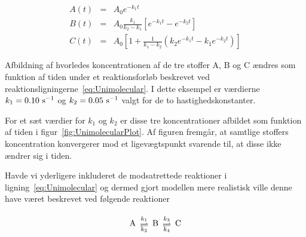 \begin{eqnarray}
  A(t) & = & A_0 e^{-k_1 t}                   \nonumber\\
  B(t) & = & A_0 \frac{k_1}{k_2-k_1} 
  \left[ e^{-k_1 t} - e^{-k_2 t} \right]               \\
  C(t) & = & A_0 \left[ 1 + \frac{1}{k_1-k_2} 
  (k_2 e^{-k_1 t} - k_1 e^{-k_2 t}) \right]   \nonumber
\end{eqnarray}

{
\begin{center}
 \vspace{1cm}
  
 \vspace{1cm}
\end{center}
}
{
\caption{\protect\capsize Afbildning af hvorledes
koncentrationen af de tre stoffer A, B og C {\ae}ndres som
funktion af tiden under et reaktions\-forl{\o}b beskrevet
ved reaktions\-lig\-ningerne~\protect\ref{eq:Unimolecular}.
I dette eksempel er v{\ae}rdierne $k_1 = {\rm 0.10~s}^{-1}$
og $k_2 = {\rm 0.05~s}^{-1}$ valgt for de to
hastigheds\-konstanter.}
\label{fig:UnimolecularPlot}
}

For et s{\ae}t v{\ae}rdier for $k_1$ og $k_2$ er disse tre
koncentrationer afbildet som funktion af tiden i
figur~\ref{fig:UnimolecularPlot}. Af figuren fremg{\aa}r,
at samtlige stoffers koncentration konvergerer mod et
ligev{\ae}gtspunkt svarende til, at disse ikke {\ae}ndrer
sig i tiden.

\vspace{4.0mm}
Havde vi yderligere inkluderet de modsatrettede reaktioner
i lig\-ning~\ref{eq:Unimolecular} og dermed gjort modellen
mere realistisk ville denne have v{\ae}ret beskrevet ved
f{\o}lgende reaktioner

{
\newcommand{\reactionarrow}[2]
{
\begin{array}{c}
  \mbox{\scriptsize $#1$} \\[-1.5mm]
  \rightleftharpoons      \\[-2.5mm]
  \mbox{\scriptsize $#2$} 
\end{array}
}

\begin{equation}
  {\rm A} \reactionarrow {k_1}{k_2} 
  {\rm B} \reactionarrow {k_3}{k_4} {\rm C} 
  \label{eq:UnimolecularReversible}
\end{equation}
}

